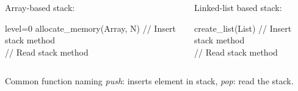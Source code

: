 \documentclass{beamer}[10pt, usepdftitle=false, handout]
\begin{document}
	\begin{frame}

	\begin{columns}[c]
	\begin{center}  
	Array-based stack:
	\scalebox{0.65} {
    \begin{algorithm}[H]
    \SetAlgoLined
	\vspace*{1em}
	level=0\;
	allocate\_memory(Array, N)\;
	\vspace*{1em}
	// Insert stack method \\    
    \vspace*{1em}
    // Read stack method\\
	\end{algorithm}	
	}
	\end{center}
	\begin{center}   
	Linked-list based stack:
	\scalebox{0.65} {
    \begin{algorithm}[H]
    \SetAlgoLined
	\vspace*{1em}	
	create\_list(List)\;
	\vspace*{1em}
	// Insert stack method \\    
    \vspace*{1em}
    // Read stack method\\
	\end{algorithm}
	}
    \end{center}
	\end{columns}	
	
	\begin{block}{Common function naming}
	\textit{push}: inserts element in stack, \textit{pop}: read the stack.
	\end{block}	
	
	\end{frame}		
	
\end{document}
